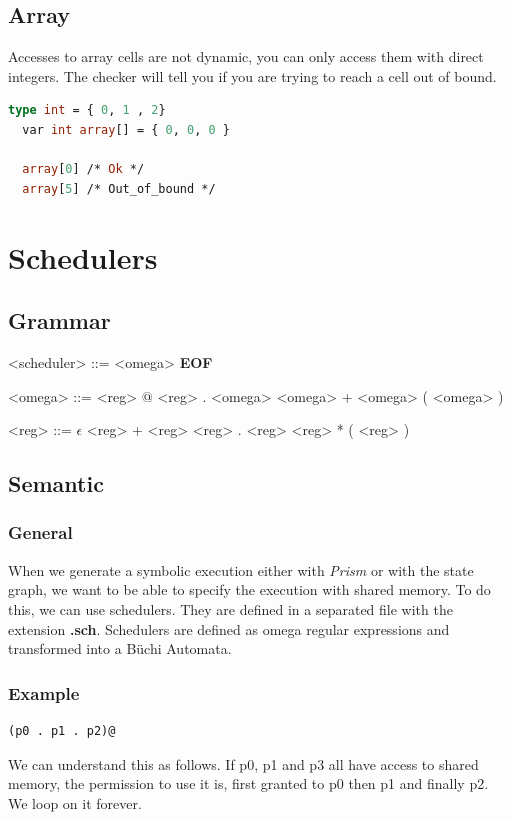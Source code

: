 \documentclass{article}
\begin{document}
     
\subsection{Array}
Accesses to array cells are not dynamic, you can only access them with direct integers. The checker will tell you if you are trying to reach a cell out of bound.
\begin{lstlisting}[language=ML]
  type int = { 0, 1 , 2}
  var int array[] = { 0, 0, 0 }

  array[0] /* Ok */
  array[5] /* Out_of_bound */
\end{lstlisting}
 
 
\section{Schedulers}
\label{sec:sch}
\subsection{Grammar}
\begin{grammar}
  <scheduler> ::= <omega> \textbf{EOF}
  
  <omega> ::= <reg> $@$
  \alt <reg> . <omega>
  \alt <omega> + <omega>
  \alt ( <omega> )
  
  <reg> ::= $\epsilon$
  \alt [a-z A-Z]
  \alt <reg> + <reg>
  \alt <reg> . <reg>
  \alt <reg> *
  \alt ( <reg> ) 
\end{grammar}

\subsection{Semantic}
\subsubsection{General}
When we generate a symbolic execution either with \textit{Prism} or with the state graph, we want to be able to specify the execution with shared memory. To do this, we can use schedulers. They are defined in a separated file with the extension \textbf{.sch}. Schedulers are defined as omega regular expressions and transformed into a Büchi Automata.

\subsubsection{Example}
\begin{lstlisting}
(p0 . p1 . p2)@
\end{lstlisting}
We can understand this as follows. If p0, p1 and p3 all have access to shared memory, the permission to use it is, first granted to p0 then p1 and finally p2. We loop on it forever.
\end{document}
